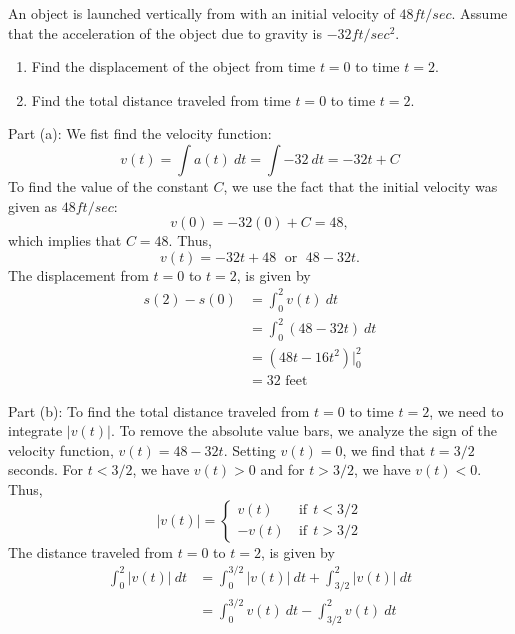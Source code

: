 \documentclass[handout]{ximera}
\begin{document}
\begin{example}[example 1]
An object is launched vertically from with an initial velocity of $48 ft/sec$. 
Assume that the acceleration of the object due to gravity is $-32 ft/sec^2$. 
\begin{enumerate}
\item Find the displacement of the object from time $t = 0$ to time $t = 2$.
\item Find the total distance traveled from time $t = 0$ to time $t = 2$.
\end{enumerate}

Part (a): We fist find the velocity function:
\[v(t) = \int a(t) \ dt = \int -32 \ dt = -32t + C\]
To find the value of the constant $C$, we use the fact that the initial velocity was given as $48 ft/sec$:
\[v(0) = -32(0) + C = 48,\]
which implies that $C = 48$.  Thus,
\[v(t) = -32t + 48 \; \mbox{ or } \; 48 - 32t.\]
The displacement from $t= 0$ to $t = 2$, is given by
\begin{align*}
s(2) - s(0) & = \int_0^2 v(t) \ dt \\
 & = \int_0^2 (48 - 32t) \ dt \\
 & = (48t - 16t^2)\bigg|_0^2 \\
 & = 32 \text{ feet}
\end{align*}

Part (b): To find the total distance traveled from $t = 0$ to time $t = 2$,
we need to integrate $|v(t)|$. To remove the absolute value bars, we analyze the 
sign of the velocity function, $v(t) = 48-32t$. Setting $v(t) = 0$, we find that $t = 3/2$ seconds.
For $t < 3/2$, we have $v(t) > 0$ and for $t > 3/2$, we have $v(t) < 0$.\\
Thus,
\[|v(t)| = \left\{
     \begin{array}{rc}
       v(t) & \ \text{if} \;\,  t < 3/2 \\
			 -v(t) & \ \text{if} \;\, t > 3/2
     \end{array}
   \right.
\]
The distance traveled from $t= 0$ to $t = 2$, is given by
\begin{align*}
  \int_0^2 |v(t)| \ dt &= \int_0^{3/2} |v(t)| \ dt + \int_{3/2}^2 |v(t)| \ dt\\
  &= \int_0^{3/2} v(t) \ dt - \int_{3/2}^2 v(t) \ dt
\end{align*}


\end{example}
\end{document}
